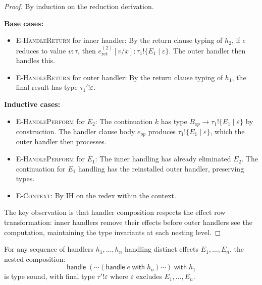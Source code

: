 \begin{proof}
By induction on the reduction derivation.

\textbf{Base cases:}
\begin{itemize}
  \item \textsc{E-HandleReturn} for inner handler: By the return clause typing of $h_2$, if $e$ reduces to value $v : \tau$, then $e_{\mathrm{ret}}^{(2)}[v/x] : \tau_1 \mathbin{!} \{E_1 \mid \varepsilon\}$. The outer handler then handles this.
  \item \textsc{E-HandleReturn} for outer handler: By the return clause typing of $h_1$, the final result has type $\tau_1' \mathbin{!} \varepsilon$.
\end{itemize}

\textbf{Inductive cases:}
\begin{itemize}
  \item \textsc{E-HandlePerform} for $E_2$: The continuation $k$ has type $B_{\mathit{op}} \to \tau_1 \mathbin{!} \{E_1 \mid \varepsilon\}$ by construction. The handler clause body $e_{\mathit{op}}$ produces $\tau_1 \mathbin{!} \{E_1 \mid \varepsilon\}$, which the outer handler then processes.

  \item \textsc{E-HandlePerform} for $E_1$: The inner handling has already eliminated $E_2$. The continuation for $E_1$ handling has the reinstalled outer handler, preserving types.

  \item \textsc{E-Context}: By IH on the redex within the context.
\end{itemize}

The key observation is that handler composition respects the effect row transformation: inner handlers remove their effects before outer handlers see the computation, maintaining the type invariants at each nesting level.
\end{proof}

\begin{corollary}
\label{cor:multi-handler}
For any sequence of handlers $h_1, \ldots, h_n$ handling distinct effects $E_1, \ldots, E_n$, the nested composition:
\[
\mathsf{handle}\; (\cdots (\mathsf{handle}\; e\; \mathsf{with}\; h_n) \cdots)\; \mathsf{with}\; h_1
\]
is type sound, with final type $\tau' \mathbin{!} \varepsilon$ where $\varepsilon$ excludes $E_1, \ldots, E_n$.
\end{corollary}

